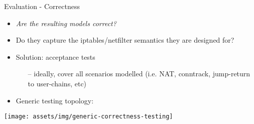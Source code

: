 \documentclass{beamer}
\begin{document}
\begin{frame}{Evaluation - Correctness}
  \begin{itemize}
    \item \emph{Are the resulting models correct?}
    \item Do they capture the iptables/netfilter semantics they are designed
      for?

    \vspace*{0.5cm}

    \item Solution: acceptance tests
      \begin{itemize}
        \item[--] ideally, cover all scenarios modelled (i.e. NAT, conntrack,
          jump-return to user-chains, etc)
      \end{itemize}
    \item Generic testing topology:
  \end{itemize}

  \vspace*{0.3cm}

  \centering
  \texttt{[image: assets/img/generic-correctness-testing]}
\end{frame}
\end{document}
